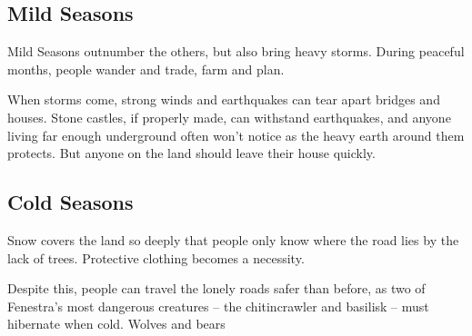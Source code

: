 \bigLine

\begin{multicols}{2}

\subsection{Mild Seasons}

Mild Seasons outnumber the others, but also bring heavy storms.
During peaceful months, people wander and trade, farm and plan.

When storms come, strong winds and earthquakes can tear apart bridges and houses.
Stone castles, if properly made, can withstand earthquakes, and anyone living far enough underground often won't notice as the heavy earth around them protects.
But anyone on the land should leave their house quickly.

\encMildVillages

\encMildEdge

\encMildForest

\end{multicols}

\noindent
\begin{minipage}{\linewidth}
\bigLine
\begin{multicols}{2}

\subsection{Cold Seasons}

Snow covers the land so deeply that people only know where the road lies by the lack of trees.
Protective clothing becomes a necessity.

Despite this, people can travel the lonely roads safer than before, as two of Fenestra's most dangerous creatures -- the chitincrawler and basilisk -- must hibernate when cold.
Wolves and bears 

\encColdVillages

\encColdEdge

\encColdForest

\end{multicols}
\end{minipage}

\bigLine

